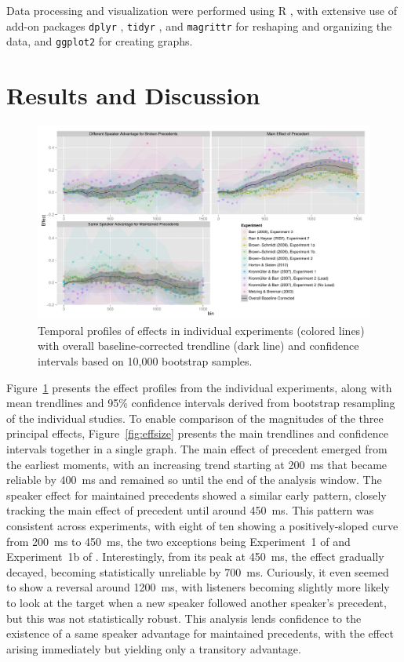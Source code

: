 \documentclass[doc,fignum,apacite,floatsintext]{apa6}
\begin{document}
Data processing and visualization were performed using R \cite{R3.1}, with extensive use of add-on packages \texttt{dplyr} \cite{dplyr-0.3.0.9}, \texttt{tidyr} \cite{tidyr-0.2.0}, and \texttt{magrittr} \cite{magrittr-1.5} for reshaping and organizing the data, and \texttt{ggplot2} \cite{ggplot2} for creating graphs.

\section{Results and Discussion}

\begin{figure}
\caption{Temporal profiles of effects in individual experiments (colored lines) with overall baseline-corrected trendline (dark line) and confidence intervals based on 10,000 bootstrap samples.}
\label{fig:allfx}
\centerline{\includegraphics[width=6in]{alleffects.pdf}}
\end{figure}

Figure~\ref{fig:allfx} presents the effect profiles from the individual experiments, along with mean trendlines and 95\% confidence intervals derived from bootstrap resampling of the individual studies.  To enable comparison of the magnitudes of the three principal effects, Figure~\ref{fig:effsize} presents the main trendlines and confidence intervals together in a single graph.  The main effect of precedent emerged from the earliest moments, with an increasing trend starting at 200~ms that became reliable by 400~ms and remained so until the end of the analysis window.  The speaker effect for maintained precedents showed a similar early pattern, closely tracking the main effect of precedent until around 450~ms.  This pattern was consistent across experiments, with eight of ten showing a positively-sloped curve from 200~ms to 450~ms, the two exceptions being Experiment~1 of  and Experiment~1b of .  Interestingly, from its peak at 450~ms, the effect gradually decayed, becoming statistically unreliable by 700~ms.  Curiously, it even seemed to show a reversal around 1200~ms, with listeners becoming slightly more likely to look at the target when a new speaker followed another speaker's precedent, but this was not statistically robust.  This analysis lends confidence to the existence of a same speaker advantage for maintained precedents, with the effect arising immediately but yielding only a transitory advantage.
\end{document}
